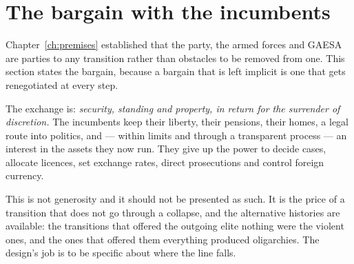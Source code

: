 \section{The bargain with the incumbents}

Chapter~\ref{ch:premises} established that the party, the armed forces and
GAESA are parties to any transition rather than obstacles to be removed from
one. This section states the bargain, because a bargain that is left implicit is
one that gets renegotiated at every step.

The exchange is: \emph{security, standing and property, in return for the
surrender of discretion.} The incumbents keep their liberty, their pensions,
their homes, a legal route into politics, and --- within limits and through a
transparent process --- an interest in the assets they now run. They give up the
power to decide cases, allocate licences, set exchange rates, direct
prosecutions and control foreign currency.

This is not generosity and it should not be presented as such. It is the price
of a transition that does not go through a collapse, and the alternative
histories are available: the transitions that offered the outgoing elite nothing
were the violent ones, and the ones that offered them everything produced
oligarchies. The design's job is to be specific about where the line falls.

